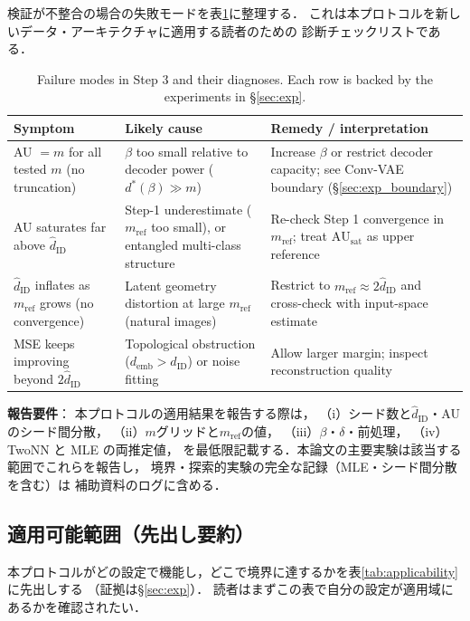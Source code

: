 \documentclass[11pt,a4paper]{jsarticle}
\newcommand{\dID}{d_{\mathrm{ID}}}
\newcommand{\hatdID}{\hat{d}_{\mathrm{ID}}}
\newcommand{\AUsat}{\mathrm{AU}_{\mathrm{sat}}}
\newcommand{\demb}{d_{\mathrm{emb}}}
\newcommand{\dstar}{d^{*}(\beta)}
\begin{document}
検証が不整合の場合の失敗モードを表\ref{tab:failure}に整理する．
これは本プロトコルを新しいデータ・アーキテクチャに適用する読者のための
診断チェックリストである．

\begin{table}[H]
\centering
\caption{Failure modes in Step 3 and their diagnoses. Each row is backed by
the experiments in §\ref{sec:exp}.}
\label{tab:failure}
\small
\begin{tabular}{p{4.2cm}p{4.6cm}p{4.6cm}}
\toprule
Symptom & Likely cause & Remedy / interpretation \\
\midrule
AU $= m$ for all tested $m$ (no truncation) & $\beta$ too small relative to decoder power ($\dstar \gg m$) & Increase $\beta$ or restrict decoder capacity; see Conv-VAE boundary (§\ref{sec:exp_boundary}) \\
AU saturates far above $\hatdID$ & Step-1 underestimate ($m_{\mathrm{ref}}$ too small), or entangled multi-class structure & Re-check Step 1 convergence in $m_{\mathrm{ref}}$; treat $\AUsat$ as upper reference \\
$\hatdID$ inflates as $m_{\mathrm{ref}}$ grows (no convergence) & Latent geometry distortion at large $m_{\mathrm{ref}}$ (natural images) & Restrict to $m_{\mathrm{ref}} \approx 2\hatdID$ and cross-check with input-space estimate \\
MSE keeps improving beyond $2\hatdID$ & Topological obstruction ($\demb > \dID$) or noise fitting & Allow larger margin; inspect reconstruction quality \\
\bottomrule
\end{tabular}
\end{table}

\textbf{報告要件}：
本プロトコルの適用結果を報告する際は，
（i）シード数と$\hatdID$・AU のシード間分散，
（ii）$m$グリッドと$m_{\mathrm{ref}}$の値，
（iii）$\beta$・$\delta$・前処理，
（iv）TwoNN と MLE の両推定値，
を最低限記載する．本論文の主要実験は該当する範囲でこれらを報告し，
境界・探索的実験の完全な記録（MLE・シード間分散を含む）は
補助資料のログに含める．

\subsection{適用可能範囲（先出し要約）}\label{sec:protocol_applicability}

本プロトコルがどの設定で機能し，どこで境界に達するかを表\ref{tab:applicability}に先出しする
（証拠は§\ref{sec:exp}）．
読者はまずこの表で自分の設定が適用域にあるかを確認されたい．
\end{document}
